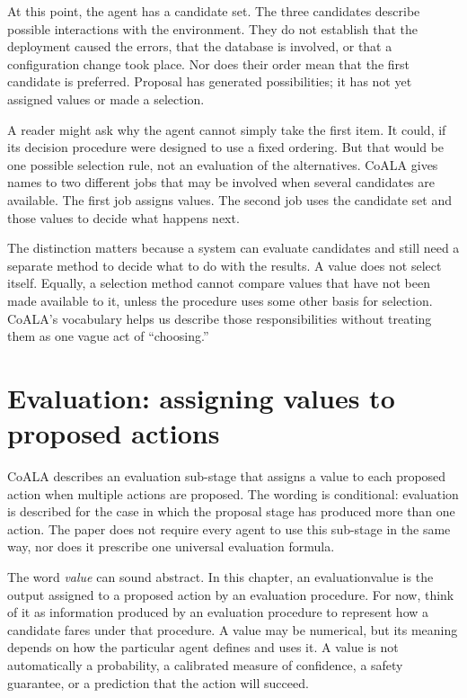 At this point, the agent has a candidate set. The three candidates describe possible interactions with the environment. They do not establish that the deployment caused the errors, that the database is involved, or that a configuration change took place. Nor does their order mean that the first candidate is preferred. Proposal has generated possibilities; it has not yet assigned values or made a selection.

A reader might ask why the agent cannot simply take the first item. It could, if its decision procedure were designed to use a fixed ordering. But that would be one possible selection rule, not an evaluation of the alternatives. CoALA gives names to two different jobs that may be involved when several candidates are available. The first job assigns values. The second job uses the candidate set and those values to decide what happens next.

The distinction matters because a system can evaluate candidates and still need a separate method to decide what to do with the results. A value does not select itself. Equally, a selection method cannot compare values that have not been made available to it, unless the procedure uses some other basis for selection. CoALA's vocabulary helps us describe those responsibilities without treating them as one vague act of ``choosing.''


\section{Evaluation: assigning values to proposed actions}
\label{sec:evaluation-values}

CoALA describes an evaluation sub-stage that assigns a value to each proposed action when multiple actions are proposed. The wording is conditional: evaluation is described for the case in which the proposal stage has produced more than one action. The paper does not require every agent to use this sub-stage in the same way, nor does it prescribe one universal evaluation formula.

The word \emph{value} can sound abstract. In this chapter, an \gls{evaluationvalue} is the output assigned to a proposed action by an evaluation procedure. For now, think of it as information produced by an evaluation procedure to represent how a candidate fares under that procedure. A value may be numerical, but its meaning depends on how the particular agent defines and uses it. A value is not automatically a probability, a calibrated measure of confidence, a safety guarantee, or a prediction that the action will succeed.

